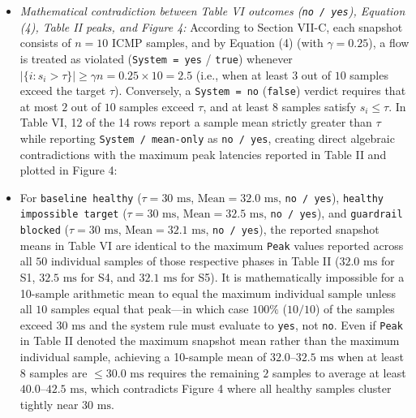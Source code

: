 \documentclass[11pt,a4paper]{article}
\begin{document}
\begin{itemize}[leftmargin=1.8em,itemsep=2pt]
\item \emph{Mathematical contradiction between Table VI outcomes (\texttt{no / yes}), Equation (4), Table II peaks, and Figure 4:} According to Section VII-C, each snapshot consists of $n = 10$ ICMP samples, and by Equation (4) (with $\gamma = 0.25$), a flow is treated as violated (\texttt{System = yes} / \texttt{true}) whenever $|\{i : s_i > \tau\}| \ge \gamma n = 0.25 \times 10 = 2.5$ (i.e., when at least $3$ out of $10$ samples exceed the target $\tau$). Conversely, a \texttt{System = no} (\texttt{false}) verdict requires that at most $2$ out of $10$ samples exceed $\tau$, and at least $8$ samples satisfy $s_i \le \tau$. In Table VI, 12 of the 14 rows report a sample mean strictly greater than $\tau$ while reporting \texttt{System / mean-only} as \texttt{no / yes}, creating direct algebraic contradictions with the maximum peak latencies reported in Table II and plotted in Figure 4:
\item For \texttt{baseline healthy} ($\tau = 30\text{ ms}$, $\text{Mean} = 32.0\text{ ms}$, \texttt{no / yes}), \texttt{healthy impossible target} ($\tau = 30\text{ ms}$, $\text{Mean} = 32.5\text{ ms}$, \texttt{no / yes}), and \texttt{guardrail blocked} ($\tau = 30\text{ ms}$, $\text{Mean} = 32.1\text{ ms}$, \texttt{no / yes}), the reported snapshot means in Table VI are identical to the maximum \texttt{Peak} values reported across all $50$ individual samples of those respective phases in Table II ($32.0\text{ ms}$ for S1, $32.5\text{ ms}$ for S4, and $32.1\text{ ms}$ for S5). It is mathematically impossible for a 10-sample arithmetic mean to equal the maximum individual sample unless all $10$ samples equal that peak—in which case $100\%$ ($10/10$) of the samples exceed $30\text{ ms}$ and the system rule must evaluate to \texttt{yes}, not \texttt{no}. Even if \texttt{Peak} in Table II denoted the maximum snapshot mean rather than the maximum individual sample, achieving a 10-sample mean of $32.0\text{--}32.5\text{ ms}$ when at least $8$ samples are $\le 30.0\text{ ms}$ requires the remaining $2$ samples to average at least $40.0\text{--}42.5\text{ ms}$, which contradicts Figure 4 where all healthy samples cluster tightly near $30\text{ ms}$.

\end{itemize}
\end{document}
